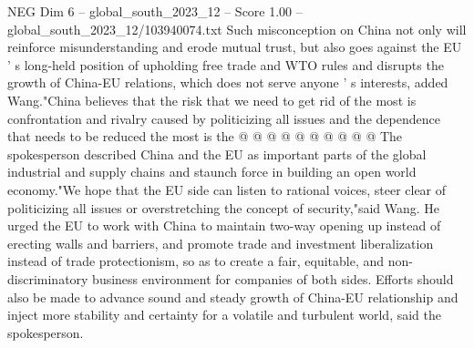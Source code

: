 \begin{textsample}{NEG Dim 6 – global\_south\_2023\_12 – Score 1.00 – global\_south\_2023\_12/103940074.txt}
Such misconception on China not only will reinforce misunderstanding and erode mutual trust, but also goes against the EU ' s long-held position of upholding free trade and WTO rules and disrupts the growth of China-EU relations, which does not serve anyone ' s interests, added Wang."China believes that the risk that we need to get rid of the most is confrontation and rivalry caused by politicizing all issues and the dependence that needs to be reduced the most is the @ @ @ @ @ @ @ @ @ @ The spokesperson described China and the EU as important parts of the global industrial and supply chains and staunch force in building an open world economy."We hope that the EU side can listen to rational voices, steer clear of politicizing all issues or overstretching the concept of security,"said Wang.
He urged the EU to work with China to maintain two-way opening up instead of erecting walls and barriers, and promote trade and investment liberalization instead of trade protectionism, so as to create a fair, equitable, and non-discriminatory business environment for companies of both sides.
Efforts should also be made to advance sound and steady growth of China-EU relationship and inject more stability and certainty for a volatile and turbulent world, said the spokesperson.

\end{textsample}
